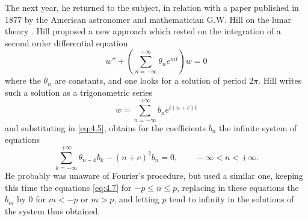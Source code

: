 \documentclass[12pt,a4paper,leqno,twoside]{extbook}
\begin{document}
The next year, he returned to the subject, in relation with a paper published in 1877 by the American astronomer and mathematician G.W. Hill on the lunar theory \cite{114}. Hill proposed a new approach which rested on the integration of a second order differential equation
\begin{equation}
    \label{eq:4.5}
    w'' + \left( \sum_{n=-\infty}^{+\infty} \theta_n e^{nit} \right) w = 0
\end{equation}
where the \(\theta_n\) are constants, and one looks for a solution of period \(2\pi\). Hill writes such a solution as a trigonometric series
\begin{equation}
    \label{eq:4.6}
    w = \sum_{n=-\infty}^{+\infty} b_n e^{i(n+c)t}
\end{equation}
and substituting in \eqref{eq:4.5}, obtains for the coefficients \(b_n\) the infinite system of equations
\begin{equation}
    \label{eq:4.7}
    \sum_{k=-\infty}^{+\infty} \theta_{n-k} b_k - (n+c)^2 b_n = 0, \qquad -\infty < n < +\infty.
\end{equation}
He probably was unaware of Fourier's procedure, but used a similar one, keeping this time the equations \eqref{eq:4.7} for \(-p \leq n \leq p\), replacing in these equations the \(b_m\) by 0 for \(m < -p\) or \(m > p\), and letting \(p\) tend to infinity in the solutions of the system thus obtained.
\end{document}
